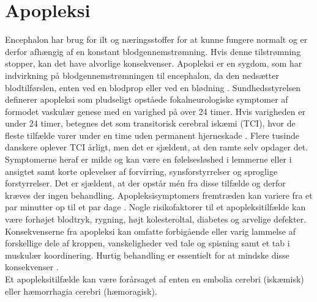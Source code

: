 \section{Apopleksi}
Encephalon har brug for ilt og næringsstoffer for at kunne fungere normalt og er derfor afhængig af en konstant blodgennemstrømning. Hvis denne tilstrømning stopper, kan det have alvorlige konsekvenser. \cite{Hjernesagen2015a} Apopleksi er en sygdom, som har indvirkning på blodgennemstrømningen til encephalon, da den nedsætter blodtilførslen, enten ved en blodprop eller ved en blødning \cite{Hjernesagen2015a}. Sundhedsstyrelsen definerer apopleksi som pludseligt opståede fokalneurologiske symptomer af formodet vaskulær genese med en varighed på over 24 timer. \cite{Sundhedsstyrelsen2009} Hvis varigheden er under 24 timer, betegnes det som transitorisk cerebral iskæmi (TCI), hvor de fleste tilfælde varer under en time uden permanent hjerneskade \cite{Sundhed.dk2014, Ritter2015}. Flere tusinde danskere oplever TCI årligt, men det er sjældent, at den ramte selv opdager det. Symptomerne heraf er milde og kan være en følelsesløshed i lemmerne eller i ansigtet samt korte oplevelser af forvirring, synsforstyrrelser og sproglige forstyrrelser. Det er sjældent, at der opstår mén fra disse tilfælde og derfor kræves der ingen behandling. \cite{Academic2015, Hjernesagen2015a} 
Apopleksisymptomers fremtræden kan variere fra et par minutter op til et par dage \cite{Academic2015,Kruuse2014}. 
Nogle risikofaktorer til et apopleksitilfælde kan være forhøjet blodtryk, rygning, højt kolesteroltal, diabetes og arvelige defekter. Konsekvenserne fra apopleksi kan omfatte forbigående eller varig lammelse af forskellige dele af kroppen, %
vanskeligheder ved tale og spisning samt et tab i muskulær koordinering. \cite{Academic2015} Hurtig behandling er essentielt for at mindske disse konsekvenser \cite{Hjernesagen2015a}. \\ %
Et apopleksitilfælde kan være forårsaget af enten en embolia cerebri (iskæmisk) eller hæmorrhagia cerebri (hæmoragisk). \cite{Ritter2015} 

